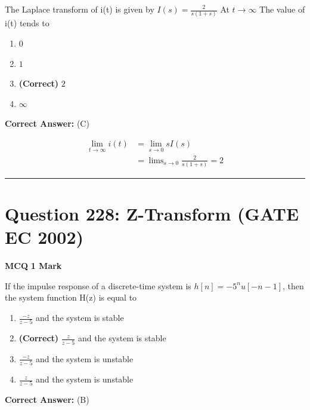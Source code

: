 \documentclass[11pt,a4paper]{article}
\begin{document}
\noindent The Laplace transform of i(t) is given by 
$I(s)=\frac{2}{s\left ( 1+s \right )}$  
At $t\rightarrow \infty$
 The value of i(t) tends to


\begin{enumerate}[label=(\Alph*)]
    \item $0$
    \item $1$
    \item \textbf{(Correct)} $2$
    \item $\infty$
\end{enumerate}

\noindent \textbf{Correct Answer:} (C)

\begin{tcolorbox}[solbox, title=Detailed Solution -- Question 227]
\[
\begin{aligned} \lim _{t \rightarrow \infty} i(t) &=\lim _{s \rightarrow 0} s I(s) \\ &=\operatorname{lims}_{s \rightarrow 0} \frac{2}{s(1+s)}=2 \end{aligned}
\]
\end{tcolorbox}

\vspace{1.5em}
\hrule
\vspace{1.5em}

\section*{Question 228: Z-Transform (GATE EC 2002)}
\noindent \textbf{\color{primary}MCQ} \hfill \textbf{\color{secondary}1 Mark}


\noindent If the impulse response of a discrete-time system is $h[n]=-5^{n}u[-n-1]$, then
the system function H(z) is equal to


\begin{enumerate}[label=(\Alph*)]
    \item $\frac{-z}{z-5}$ and the system is stable
    \item \textbf{(Correct)} $\frac{z}{z-5}$ and the system is stable
    \item $\frac{-z}{z-5}$ and the system is unstable
    \item $\frac{z}{z-5}$ and the system is unstable
\end{enumerate}

\noindent \textbf{Correct Answer:} (B)
\end{document}
